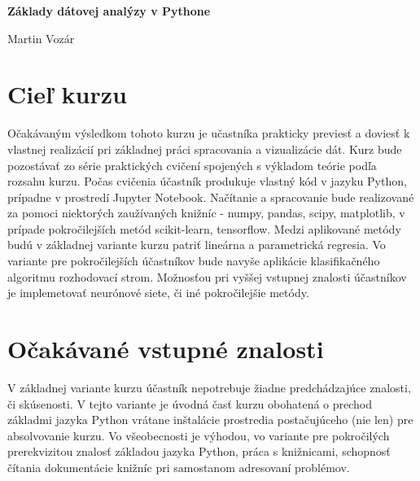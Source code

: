 \documentclass[12pt]{article}
\begin{document}
\baselineskip 15pt

\begin{center}
\textbf{\Large Základy dátovej analýzy v Pythone}

\vspace{1.5cc}
{ \sc Martin Vozár}

\end{center}

\vspace{0.3 cm}


\section*{Cieľ kurzu}
Očakávaným výsledkom tohoto kurzu je učastníka prakticky previesť a doviesť
k vlastnej realizácií pri základnej práci spracovania a vizualizácie dát.
\newline \newline
Kurz bude pozostávať zo série praktických cvičení spojených s výkladom
teórie podľa rozsahu kurzu.
\newline \newline
Počas cvičenia účastník produkuje vlastný kód v jazyku Python,
prípadne v prostredí Jupyter Notebook. Načítanie a spracovanie bude
realizované za pomoci niektorých zaužívaných knižníc - numpy, pandas,
scipy, matplotlib, v prípade pokročilejších metód scikit-learn,
tensorflow.
\newline \newline
Medzi aplikované metódy budú v základnej variante kurzu patriť 
lineárna a parametrická regresia. Vo variante pre pokročilejších
účastníkov bude navyše aplikácie klasifikačného algoritmu 
rozhodovací strom. Možnosťou pri vyššej vstupnej znalosti účastníkov je
implemetovať neurónové siete, či iné pokročilejšie metódy.

\section*{Očakávané vstupné znalosti}
V základnej variante kurzu účastník nepotrebuje žiadne predchádzajúce
znalosti, či skúsenosti. V tejto variante je úvodná časť kurzu obohatená
o prechod základmi jazyka Python vrátane inštalácie prostredia
postačujúceho (nie len) pre absolvovanie kurzu.
\newline \newline
Vo všeobecnosti je výhodou, vo variante pre pokročilých prerekvizitou
znalosť základou jazyka Python, práca s knižnicami, schopnosť čítania
dokumentácie knižníc pri samostanom adresovaní problémov.
\end{document}
